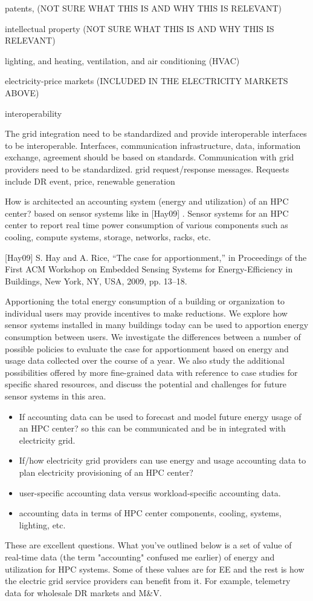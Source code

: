 patents, (NOT SURE WHAT THIS IS AND WHY THIS IS RELEVANT)

intellectual property (NOT SURE WHAT THIS IS AND WHY THIS IS RELEVANT)

lighting, and heating, ventilation, and air conditioning (HVAC)


electricity-price markets (INCLUDED IN THE ELECTRICITY MARKETS ABOVE)

interoperability

The grid integration need to be standardized and provide interoperable
interfaces to be interoperable. Interfaces, communication infrastructure,
data, information exchange, agreement should be based on standards.
Communication with grid providers need to be standardized. grid
request/response messages. Requests include DR event, price, renewable
generation


How is architected an accounting system (energy and utilization) of an HPC
center? based on sensor systems like in [Hay09] . Sensor systems for an HPC
center to report real time power consumption of various components such as
cooling, compute systems, storage, networks, racks, etc.

[Hay09] S. Hay and A. Rice, ``The case for apportionment,'' in Proceedings
of the First ACM Workshop on Embedded Sensing Systems for Energy-Efficiency
in Buildings, New York, NY, USA, 2009, pp. 13--18.

Apportioning the total energy consumption of a building or organization to
individual users may provide incentives to make reductions. We explore how
sensor systems installed in many buildings today can be used to apportion
energy consumption between users. We investigate the differences between a
number of possible policies to evaluate the case for apportionment based on
energy and usage data collected over the course of a year. We also study the
additional possibilities offered by more fine-grained data with reference to
case studies for specific shared resources, and discuss the potential and
challenges for future sensor systems in this area.

\begin{itemize}
\item If accounting data can be used to forecast and model future energy usage of an HPC center? so this can be communicated and be in
integrated with electricity grid.
\item If/how electricity grid providers can use energy and usage accounting data to plan electricity provisioning of an HPC center?
\item user-specific accounting data versus workload-specific accounting data.
\item accounting data in terms of HPC center components, cooling, systems, lighting, etc.
\end{itemize}
These are excellent questions. What you've outlined below is a set of value
of real-time data (the term "accounting" confused me earlier) of energy and
utilization for HPC systems. Some of these values are for EE and the rest is
how the electric grid service providers can benefit from it. For example,
telemetry data for wholesale DR markets and M{\&}V.

